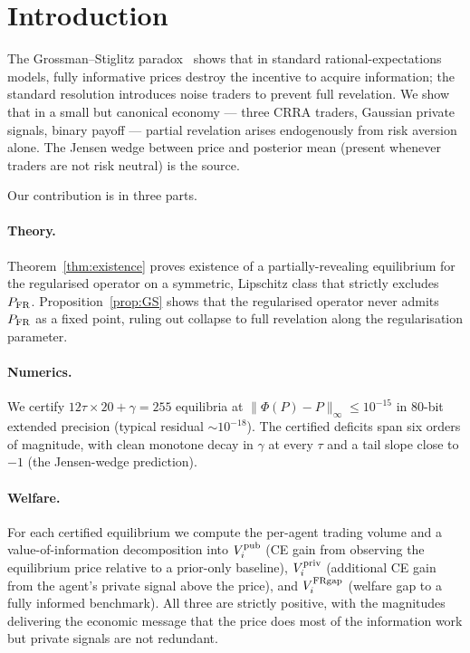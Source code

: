 \documentclass[11pt]{article}
\newcommand{\1}{\mathbf{1}}
\newcommand{\Vipub}{V_{i}^{\rm pub}}
\newcommand{\Vipriv}{V_{i}^{\rm priv}}
\newcommand{\ViFR}{V_{i}^{\rm FRgap}}
\begin{document}
\tableofcontents
\newpage

\section{Introduction}

The Grossman--Stiglitz paradox~\cite{GS1980} shows that in standard
rational-expectations models, fully informative prices destroy the
incentive to acquire information; the standard resolution introduces
noise traders to prevent full revelation. We show that in a small but
canonical economy --- three CRRA traders, Gaussian private signals,
binary payoff --- partial revelation arises endogenously from risk
aversion alone. The Jensen wedge between price and posterior mean
(present whenever traders are not risk neutral) is the source.

Our contribution is in three parts.
\paragraph{Theory.} Theorem~\ref{thm:existence} proves existence of
a partially-revealing equilibrium for the regularised operator on a
symmetric, Lipschitz class that strictly excludes $P_{\rm FR}$.
Proposition~\ref{prop:GS} shows that the regularised operator never
admits $P_{\rm FR}$ as a fixed point, ruling out collapse to full
revelation along the regularisation parameter.
\paragraph{Numerics.} We certify $12 \tau \times 20+ \gamma = 255$ equilibria at
$\|\Phi(P)-P\|_\infty \le 10^{-15}$ in 80-bit extended precision
(typical residual $\sim 10^{-18}$). The certified deficits span six
orders of magnitude, with clean monotone decay in $\gamma$ at every $\tau$
and a tail slope close to $-1$ (the Jensen-wedge prediction).
\paragraph{Welfare.} For each certified equilibrium we compute the
per-agent trading volume and a value-of-information decomposition into
$\Vipub$ (CE gain from observing the equilibrium price relative to a
prior-only baseline), $\Vipriv$ (additional CE gain from the agent's
private signal above the price), and $\ViFR$ (welfare gap to a fully
informed benchmark). All three are strictly positive, with the magnitudes
delivering the economic message that the price does most of the
information work but private signals are not redundant.
\end{document}
